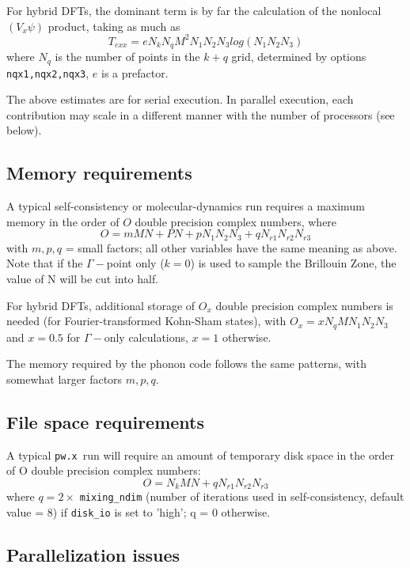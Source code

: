 \documentclass[12pt,a4paper]{article}
\def\pwx{\texttt{pw.x}}
\begin{document}
For hybrid DFTs, the dominant term is by far the calculation of the 
nonlocal $(V_x\psi)$ product, taking as much as
$$T_{exx} = e N_k N_q M^2 N_1 N_2N_3 log(N_1 N_2 N_3)$$
where $N_q$ is the number of points in the $k+q$ grid, determined by
options \texttt{nqx1,nqx2,nqx3}, $e$ is a prefactor.

The above estimates are for serial execution. In parallel execution,
each contribution may scale in a different manner with the number of processors (see below).

\subsection{Memory requirements}

A typical self-consistency or molecular-dynamics run requires a maximum
memory in the order of $O$ double precision complex numbers, where
$$ O = m M N + P N + p N_1 N_2 N_3 + q N_{r1} N_{r2} N_{r3}$$
with $m, p, q$ = small factors; all other variables have the same meaning as
above. Note that if the $\Gamma-$point only ($k=0$) is used to sample the 
Brillouin Zone, the value of N will be cut into half.

For hybrid DFTs, additional storage of $O_x$ double precision complex 
numbers is needed (for Fourier-transformed Kohn-Sham states), with
$O_x = x N_q M N_1N_2N_3$ and $x=0.5$ for $\Gamma-$only 
calculations, $x=1$ otherwise.

The memory required by the phonon code follows the same patterns, with
somewhat larger factors $m, p, q$.

\subsection{File space requirements}

A typical \pwx\ run will require an amount of temporary disk space in the
order of O double precision complex numbers:
$$O = N_k M N + q N_{r1} N_{r2}N_{r3}$$
where $q = 2\times$ \texttt{mixing\_ndim} (number of iterations used in 
self-consistency, default value = 8) if \texttt{disk\_io} is set to 'high'; q = 0 
otherwise.

\subsection{Parallelization issues}
\label{SubSec:badpara}
\end{document}
